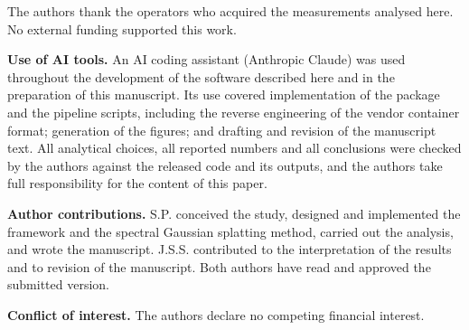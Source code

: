 The authors thank the operators who acquired the measurements analysed here.
No external funding supported this work.

\textbf{Use of AI tools.} An AI coding assistant (Anthropic Claude) was used
throughout the development of the software described here and in the preparation of
this manuscript. Its use covered implementation of the \ramansp{} package and the
pipeline scripts, including the reverse engineering of the vendor container format;
generation of the figures; and drafting and revision of the manuscript text. All
analytical choices, all reported numbers and all conclusions were checked by the
authors against the released code and its outputs, and the authors take full
responsibility for the content of this paper.

\textbf{Author contributions.} S.P. conceived the study, designed and implemented
the framework and the spectral Gaussian splatting method, carried out the
analysis, and wrote the manuscript. J.S.S. contributed to the interpretation of
the results and to revision of the manuscript. Both authors have read and
approved the submitted version.

\textbf{Conflict of interest.} The authors declare no competing financial
interest.

